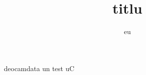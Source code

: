 \documentclass[12pt]{article}
\title{titlu}
\author{eu}
\begin{document}
\maketitle
deocamdata un test \linebreak
uC
\end{document}
